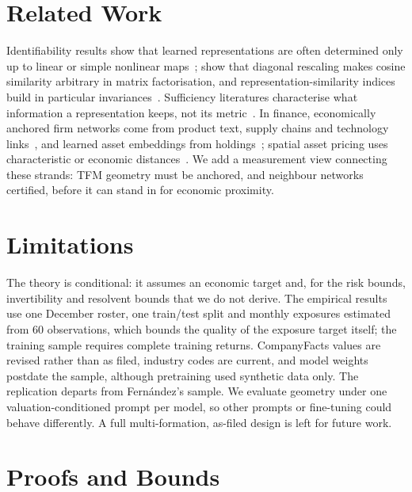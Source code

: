 \documentclass[letterpaper]{article} %
\theoremstyle{definition}
\begin{document}
\section{Related Work}\label{sec:related}
Identifiability results show that learned representations are often determined
only up to linear or simple nonlinear maps~\citep{roeder2021,khemakhem2020};
\citet{steck2024} show that diagonal rescaling makes cosine similarity
arbitrary in matrix factorisation, and representation-similarity indices build
in particular invariances~\citep{kornblith2019,huh2024}. Sufficiency
literatures characterise what information a representation keeps, not its
metric~\citep{achille2018}. In finance, economically anchored firm networks
come from product text, supply chains and technology
links~\citep{hoberg2016,cohen2008,lee2019technological}, and learned asset
embeddings from holdings~\citep{gabaix2025asset}; spatial asset pricing uses
characteristic or economic distances~\citep{fernandez2011,kou2018,
fulle2024spatial}. We add a measurement view connecting these strands:
TFM geometry must be anchored, and neighbour networks certified, before it can
stand in for economic proximity.

\section{Limitations}\label{sec:limits}
The theory is conditional: it assumes an economic target and, for the risk
bounds, invertibility and resolvent bounds that we do not derive. The empirical
results use one December roster, one train/test split and monthly exposures
estimated from 60 observations, which bounds the quality of the exposure
target itself; the training sample requires complete training returns.
CompanyFacts values are revised rather than as filed, industry codes are
current, and model weights postdate the sample, although pretraining used
synthetic data only. The replication departs from Fern\'andez's sample. We
evaluate geometry under one valuation-conditioned prompt per model, so other
prompts or fine-tuning could behave differently. A full multi-formation,
as-filed design is left for future work.



\appendix
\section{Proofs and Bounds}\label{app:proofs}
\end{document}
